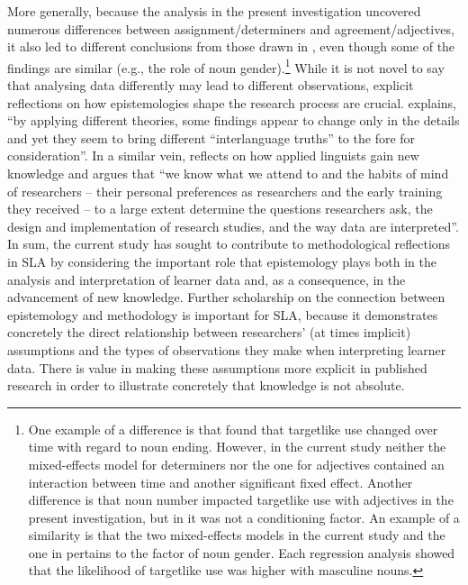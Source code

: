 \documentclass[output=paper,colorlinks,citecolor=brown,modfonts,nonflat]{../langscibook}
\begin{document}
More generally, because the analysis in the present investigation uncovered numerous differences between assignment/determiners and agreement/adjectives, it also led to different conclusions from those drawn in \citet{GudmestadEtAl2019}, even though some of the findings are similar (e.g., the role of noun gender).\footnote{{One example of a difference is that \citet{GudmestadEtAl2019} found that targetlike use changed over time with regard to noun ending. However, in the current study neither the mixed-effects model for determiners nor the one for adjectives contained an interaction between time and another significant fixed effect. Another difference is that noun number impacted targetlike use with adjectives in the present investigation, but in \citeauthor{GudmestadEtAl2019} it was not a conditioning factor. An example of a similarity is that the two mixed-effects models in the current study and the one in \citeauthor{GudmestadEtAl2019} pertains to the factor of noun gender. Each regression analysis showed that the likelihood of targetlike use was higher with masculine nouns.}} While it is not novel to say that analysing data differently may lead to different observations, explicit reflections on how epistemologies shape the research process are crucial. \citet[194]{Ortega2014trying} explains, “by applying different theories, some findings appear to change only in the details and yet they seem to bring different ``interlanguage truths'' to the fore for consideration”. In a similar vein, \citet[48]{Young2018} reflects on how applied linguists gain new knowledge and argues that “we know what we attend to and the habits of mind of researchers – their personal preferences as researchers and the early training they received – to a large extent determine the questions researchers ask, the design and implementation of research studies, and the way data are interpreted”. In sum, the current study has sought to contribute to methodological reflections in SLA by considering the important role that epistemology plays both in the analysis and interpretation of learner data and, as a consequence, in the advancement of new knowledge. Further scholarship on the connection between epistemology and methodology is important for SLA, because it demonstrates concretely the direct relationship between researchers’ (at times implicit) assumptions and the types of observations they make when interpreting learner data. There is value in making these assumptions more explicit in published research in order to illustrate concretely that knowledge is not absolute.

{\sloppy\printbibliography[heading=subbibliography,notkeyword=this]}
\end{document}

